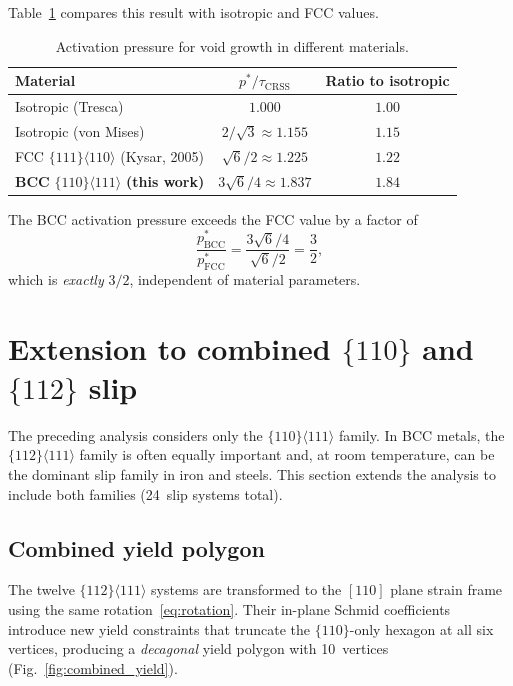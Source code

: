 \documentclass{svjour3} %
\newcommand{\tcrss}{\tau_{\mathrm{CRSS}}}
\begin{document}
Table~\ref{tab:activation} compares this result with isotropic and FCC
values.

\begin{table}[htb]
\caption{Activation pressure for void growth in different materials.}
\label{tab:activation}
\centering
\begin{tabular}{lcc}
\toprule
Material & $p^* / \tcrss$ & Ratio to isotropic \\
\midrule
Isotropic (Tresca)            & $1.000$ & $1.00$ \\
Isotropic (von Mises)         & $2/\sqrt{3} \approx 1.155$ & $1.15$ \\
FCC $\{111\}\langle 110\rangle$ (Kysar, 2005) & $\sqrt{6}/2 \approx 1.225$ & $1.22$ \\
\textbf{BCC} $\{110\}\langle 111\rangle$ \textbf{(this work)}
                              & $3\sqrt{6}/4 \approx 1.837$ & $1.84$ \\
\bottomrule
\end{tabular}
\end{table}

The BCC activation pressure exceeds the FCC value by a factor of
\begin{equation}
\label{eq:ratio}
\frac{p^*_{\mathrm{BCC}}}{p^*_{\mathrm{FCC}}}
  = \frac{3\sqrt{6}/4}{\sqrt{6}/2} = \frac{3}{2},
\end{equation}
which is \emph{exactly} $3/2$, independent of material parameters.

\section{Extension to combined $\{110\}$ and $\{112\}$ slip}
\label{sec:combined}

The preceding analysis considers only the $\{110\}\langle 111\rangle$
family. In BCC metals, the $\{112\}\langle 111\rangle$ family is often
equally important and, at room temperature, can be the dominant slip
family in iron and steels. This section extends the analysis to include
both families (24~slip systems total).

\subsection{Combined yield polygon}

The twelve $\{112\}\langle 111\rangle$ systems are transformed to the
$[110]$ plane strain frame using the same rotation~\eqref{eq:rotation}.
Their in-plane Schmid coefficients introduce new yield constraints that
truncate the $\{110\}$-only hexagon at all six vertices, producing a
\emph{decagonal} yield polygon with 10~vertices
(Fig.~\ref{fig:combined_yield}).
\end{document}
